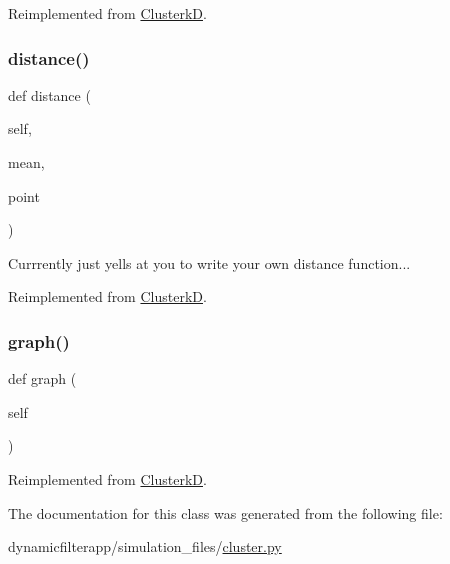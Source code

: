 Reimplemented from \mbox{\hyperlink{classdynamicfilterapp_1_1simulation__files_1_1cluster_1_1_clusterk_d_aac77177976d5d302c5b583d66aec9275}{ClusterkD}}.

\mbox{\label{classdynamicfilterapp_1_1simulation__files_1_1cluster_1_1_cluster2_d_a52f9d99950e63d5a8748e36e2ccfd48a}} 
\subsubsection{\texorpdfstring{distance()}{distance()}}
{\footnotesize\ttfamily def distance (\begin{DoxyParamCaption}\item[{}]{self,  }\item[{}]{mean,  }\item[{}]{point }\end{DoxyParamCaption})}

\begin{DoxyVerb}Currrently just yells at you to write your own distance function...
\end{DoxyVerb}
 

Reimplemented from \mbox{\hyperlink{classdynamicfilterapp_1_1simulation__files_1_1cluster_1_1_clusterk_d_a52f9d99950e63d5a8748e36e2ccfd48a}{ClusterkD}}.

\mbox{\label{classdynamicfilterapp_1_1simulation__files_1_1cluster_1_1_cluster2_d_a32122ca5e18d511dacbccf1be6e60dbd}} 
\subsubsection{\texorpdfstring{graph()}{graph()}}
{\footnotesize\ttfamily def graph (\begin{DoxyParamCaption}\item[{}]{self }\end{DoxyParamCaption})}



Reimplemented from \mbox{\hyperlink{classdynamicfilterapp_1_1simulation__files_1_1cluster_1_1_clusterk_d_a32122ca5e18d511dacbccf1be6e60dbd}{ClusterkD}}.



The documentation for this class was generated from the following file\+:\begin{DoxyCompactItemize}
\item 
dynamicfilterapp/simulation\+\_\+files/\mbox{\hyperlink{cluster_8py}{cluster.\+py}}\end{DoxyCompactItemize}
